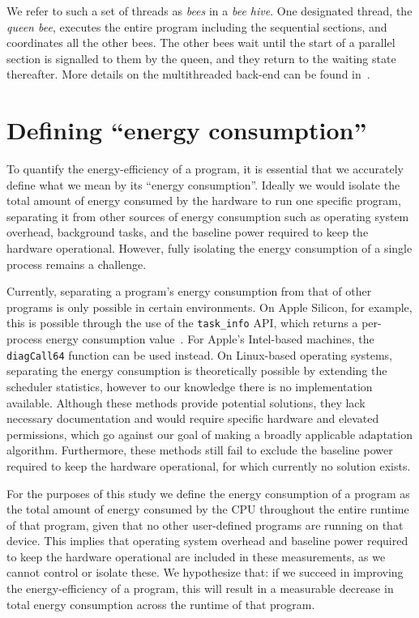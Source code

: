 \documentclass[runningheads]{llncs}
\begin{document}
We refer to such a set of threads as \emph{bees} in a \emph{bee hive}.
One designated thread, the \emph{queen bee}, executes the entire program including the sequential sections, and coordinates all the other bees.
The other bees wait until the start of a parallel section is signalled to them by the queen, and they return to the waiting state thereafter.
More details on the multithreaded back-end can be found in~\cite{grelck2005shared}.

\section{Defining ``energy consumption''}\label{sec:energy}
To quantify the energy-efficiency of a program, it is essential that we accurately define what we mean by its ``energy consumption''.
Ideally we would isolate the total amount of energy consumed by the hardware to run one specific program, separating it from other sources of energy consumption such as operating system overhead, background tasks, and the baseline power required to keep the hardware operational.
However, fully isolating the energy consumption of a single process remains a challenge.

Currently, separating a program's energy consumption from that of other programs is only possible in certain environments.
On Apple Silicon, for example, this is possible through the use of the \texttt{task\_info} API, which returns a per-process energy consumption value~\cite{queze2023power}.
For Apple's Intel-based machines, the \texttt{diagCall64} function can be used instead.
On Linux-based operating systems, separating the energy consumption is theoretically possible by extending the scheduler statistics, however to our knowledge there is no implementation available.
Although these methods provide potential solutions, they lack necessary documentation and would require specific hardware and elevated permissions, which go against our goal of making a broadly applicable adaptation algorithm.
Furthermore, these methods still fail to exclude the baseline power required to keep the hardware operational, for which currently no solution exists.

For the purposes of this study we define the energy consumption of a program as the total amount of energy consumed by the CPU throughout the entire runtime of that program, given that no other user-defined programs are running on that device.
This implies that operating system overhead and baseline power required to keep the hardware operational are included in these measurements, as we cannot control or isolate these.
We hypothesize that: if we succeed in improving the energy-efficiency of a program, this will result in a measurable decrease in total energy consumption across the runtime of that program.
\end{document}

